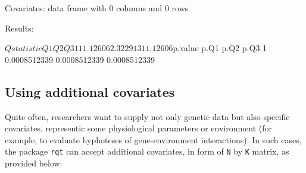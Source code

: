 \documentclass{article}
\begin{document}
\begin{Schunk}
\begin{Soutput}
Covariates:
data frame with 0 columns and 0 rows


Results:

$Qstatistic
        Q1       Q2       Q3
1 11.12606 2.322913 11.12606

$p.value
          p.Q1         p.Q2         p.Q3
1 0.0008512339 0.0008512339 0.0008512339
\end{Soutput}
\end{Schunk}

\subsection{Using additional covariates}

Quite often, researchers want to supply not only genetic 
data but also specific covariates, 
representic some physiological parameters or environment 
(for example, to evaluate 
hyphoteses of gene-environment interactions). 
In such cases, the package \texttt{rqt} 
can accept additional covariates, in form of 
\texttt{N} by \texttt{K} matrix, as provided below:
\end{document}
